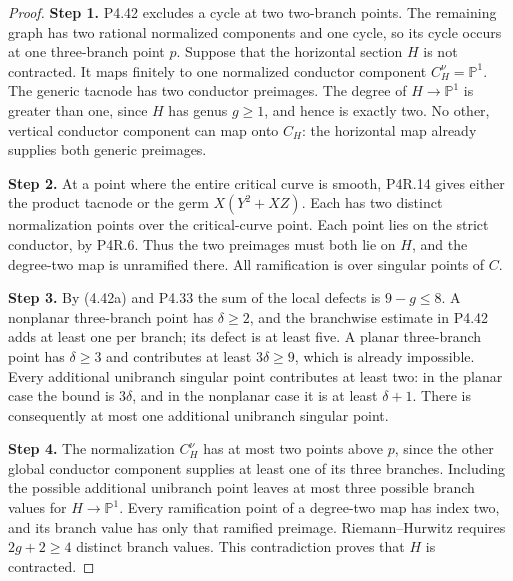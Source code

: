 \begin{proof}
\noindent\textbf{Step 1.} P4.42 excludes a cycle at two two-branch points. The
remaining graph has two rational normalized components
and one cycle, so its cycle occurs at one three-branch
point $p$. Suppose that the horizontal section $H$ is
not contracted. It maps finitely to one normalized
conductor component $C_H^\nu=\mathbb P^1$.
The generic tacnode has two conductor preimages.
The degree of $H\to\mathbb P^1$ is greater than one,
since $H$ has genus $g\ge1$, and hence is exactly two.
No other, vertical conductor component can map onto
$C_H$: the horizontal map already supplies both generic
preimages.

\noindent\textbf{Step 2.} At a point where the entire critical curve is smooth,
P4R.14 gives either the product tacnode or the germ
$X(Y^2+XZ)$. Each has two distinct normalization points
over the critical-curve point. Each point lies on the
strict conductor, by P4R.6. Thus the two preimages must
both lie on $H$, and the degree-two map is unramified
there. All ramification is over singular points of $C$.

\noindent\textbf{Step 3.} By (4.42a) and P4.33 the sum of the local defects is
$9-g\le8$. A nonplanar three-branch point has
$\delta\ge2$, and the branchwise estimate in P4.42
adds at least one per branch; its defect is at least
five. A planar three-branch point has $\delta\ge3$
and contributes at least $3\delta\ge9$, which is
already impossible. Every additional unibranch singular
point contributes at least two: in the planar case
the bound is $3\delta$, and in the nonplanar case it is
at least $\delta+1$. There is consequently at most one
additional unibranch singular point.

\noindent\textbf{Step 4.} The normalization $C_H^\nu$ has at most two points
above $p$, since the other global conductor component
supplies at least one of its three branches. Including
the possible additional unibranch point leaves at most
three possible branch values for $H\to\mathbb P^1$.
Every ramification point of a degree-two map has index
two, and its branch value has only that ramified
preimage. Riemann--Hurwitz requires $2g+2\ge4$ distinct
branch values. This contradiction proves that $H$ is
contracted.
\end{proof}

